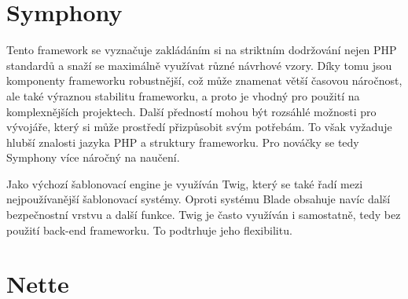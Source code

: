 \documentclass[czech,BP]{thesiskiv}
\begin{document}
\section{Symphony}
\par Tento framework se vyznačuje zakládáním si na striktním dodržování nejen PHP standardů a snaží se maximálně využívat různé návrhové vzory. Díky tomu jsou komponenty frameworku robustnější, což může znamenat větší časovou náročnost, ale také výraznou stabilitu frameworku, a proto je vhodný pro použití na komplexnějších projektech. Další předností mohou být rozsáhlé možnosti pro vývojáře, který si může prostředí přizpůsobit svým potřebám. To však vyžaduje hlubší znalosti jazyka PHP a struktury frameworku. Pro nováčky se tedy Symphony více náročný na naučení.
\par Jako výchozí šablonovací engine je využíván Twig, který se také řadí mezi nejpoužívanější šablonovací systémy. Oproti systému Blade obsahuje navíc další bezpečnostní vrstvu a další funkce. Twig je často využíván i samostatně, tedy bez použití back-end frameworku. To podtrhuje jeho flexibilitu.
\section{Nette}
% 
%

{\raggedright\small

}
\end{document}
